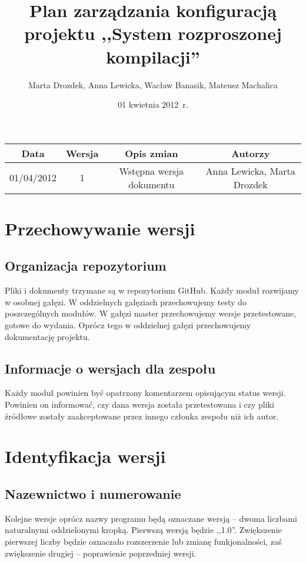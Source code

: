 \documentclass[a4paper]{article}
\title{Plan zarządzania konfiguracją projektu ,,System rozproszonej kompilacji''}
\author{Marta Drozdek, Anna Lewicka, Wacław Banasik, Mateusz Machalica}
\date{01 kwietnia 2012~r.}
\begin{document}
\maketitle

\begin{table}[!h]
	\centering
	\begin{tabular}{|c|c|c|c|}
		\hline
		\textbf{Data} & \textbf{Wersja} & \textbf{Opis zmian} & \textbf{Autorzy} \\ \hline
		01/04/2012 & 1 & Wstępna wersja dokumentu & Anna Lewicka, Marta Drozdek \\ \hline
	\end{tabular}
\end{table}

\section{Przechowywanie wersji}

\subsection{Organizacja repozytorium}
 
Pliki i dokumenty trzymane są w repozytorium GitHub. Każdy moduł rozwijamy w osobnej gałęzi. W oddzielnych gałęziach przechowujemy testy do poszczególnych modułów. W gałęzi master przechowujemy wersje przetestowane, gotowe do wydania. Oprócz tego w oddzielnej gałęzi przechowujemy dokumentację projektu.

\subsection{Informacje o wersjach dla zespołu}

Każdy moduł powinien  być opatrzony komentarzem opisującym status wersji. Powinien on informować, czy dana wersja została przetestowana i czy pliki źródłowe zostały zaakceptowane przez innego członka zespołu niż ich autor.

\section{Identyfikacja wersji}

\subsection{Nazewnictwo i numerowanie}

Kolejne wersje oprócz nazwy programu będą oznaczane wersją -- dwoma liczbami naturalnymi oddzielonymi kropką. Pierwszą wersją będzie ,,1.0''. Zwiększenie pierwszej liczby będzie oznaczało rozszerzenie lub zmianę funkjonalności, zaś zwiększenie drugiej -- poprawienie poprzedniej wersji.
\end{document}
